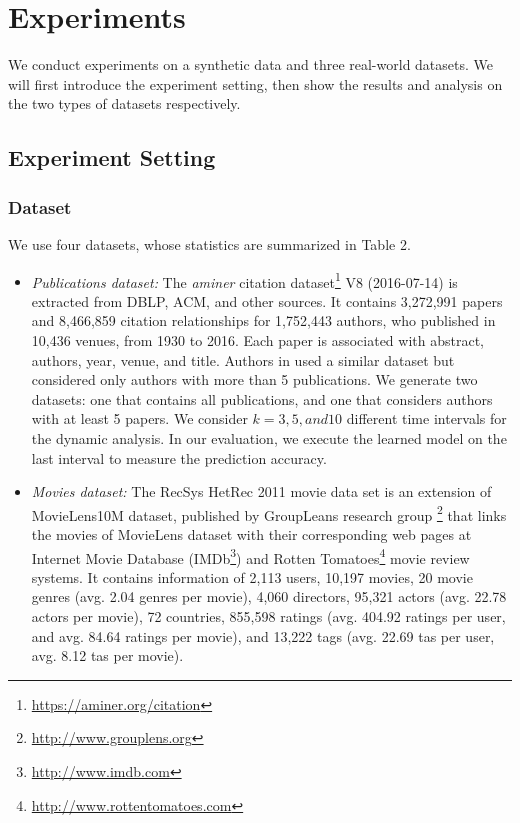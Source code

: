 \section{Experiments}


We conduct experiments on a synthetic data and three real-world datasets. We will first introduce the experiment setting, then show the results and analysis on the two types
of datasets respectively.


\subsection{Experiment Setting}

\subsubsection{Dataset} We use four datasets, whose statistics are summarized in Table 2.

\begin{itemize}
    \item \textit{Publications dataset:} The \textit{aminer} citation dataset\footnote{\url{https://aminer.org/citation}} V8 (2016-07-14) is extracted from DBLP, ACM, and other sources. It contains 3,272,991 papers and 8,466,859 citation relationships for 1,752,443 authors, who published in 10,436 venues, from 1930 to 2016. Each paper is associated with abstract, authors, year, venue, and title.  Authors in \cite{sun2011ASONAM} used a similar dataset but considered only authors with more than 5 publications. We generate two datasets: one that contains all publications, and one that considers authors with at least 5 papers. We consider $k=3, 5, and 10$ different time intervals for the dynamic analysis. In our evaluation, we execute the learned model on the last interval to measure the prediction accuracy.
    
    \item \textit{Movies dataset:} The RecSys HetRec 2011 movie data set \cite{Cantador:RecSys2011} is an extension of MovieLens10M dataset, published by GroupLeans research group \footnote{\url{http://www.grouplens.org}} that links the movies of MovieLens dataset with their corresponding web pages at Internet Movie Database (IMDb\footnote{\url{http://www.imdb.com}}) and Rotten Tomatoes\footnote{\url{http://www.rottentomatoes.com}} movie review systems. It contains information of 2,113 users, 10,197 movies, 20 movie genres (avg. 2.04 genres per movie), 4,060 directors, 95,321 actors (avg. 22.78 actors per movie), 72 countries, 855,598 ratings (avg. 404.92 ratings per user, and avg. 84.64 ratings per movie), and 13,222 tags (avg. 22.69 tas per user, avg. 8.12 tas per movie).

\end{itemize}


